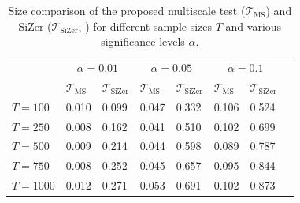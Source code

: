 \documentclass[a4paper,12pt]{article}
\begin{document}
\begin{table}[t!]
\footnotesize{
\caption{Size comparison of the proposed multiscale test ($\mathcal{T}_{\text{MS}}$) and SiZer ($\mathcal{T}_{\text{SiZer}}$, \cite{Park2009}) for different sample sizes $T$ and various significance levels $\alpha$.}\label{tab:size:compare}
\begin{tabularx}{\textwidth}{l@{\hskip 20pt} Z@{\hskip 6pt}Z@{\hskip 20pt}Z@{\hskip 6pt}Z@{\hskip 6pt}Z@{\hskip 6pt}Z@{\hskip 20pt}Z}
\toprule
 &  &  & \\
 & $\mathcal{T}_{\text{MS}}$ & $\mathcal{T}_{\text{SiZer}}$   & $\mathcal{T}_{\text{MS}}$ & $\mathcal{T}_{\text{SiZer}}$ & $\mathcal{T}_{\text{MS}}$ & $\mathcal{T}_{\text{SiZer}}$\\
  $T = 100$ & 0.010 & 0.099 & 0.047 & 0.332 & 0.106 & 0.524 \\ 
  $T = 250$ & 0.008 & 0.162 & 0.041 & 0.510 & 0.102 & 0.699 \\ 
  $T = 500$ & 0.009 & 0.214 & 0.044 & 0.598 & 0.089 & 0.787 \\ 
  $T = 750$ & 0.008 & 0.252 & 0.045 & 0.657 & 0.095 & 0.844 \\ 
  $T = 1000$ & 0.012 & 0.271 & 0.053 & 0.691 & 0.102 & 0.873 \\ 
\bottomrule
\end{tabularx}}
\vspace{0.2cm}
\end{table}
\end{document}
